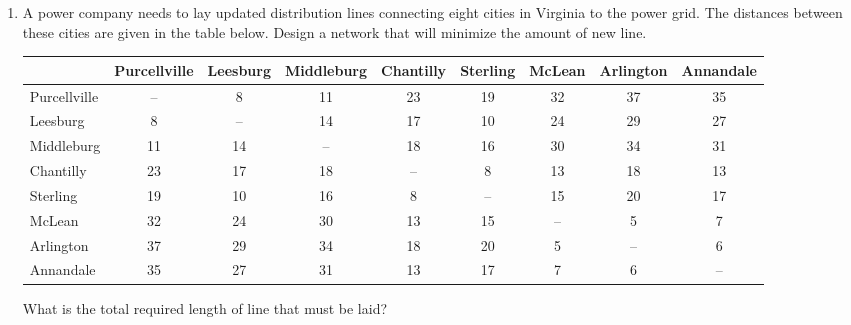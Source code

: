 \begin{enumerate}
\item A power company needs to lay updated distribution lines connecting eight cities in Virginia to the power grid.  The distances between these cities are given in the table below.  Design a network that will minimize the amount of new line.
\begin{center}
\begin{tabular}{l | c c c c c c c c}
& Purcellville & Leesburg & Middleburg & Chantilly & Sterling & McLean & Arlington & Annandale\\
\hline
Purcellville & -- & 8 & 11 & 23 & 19 & 32 & 37 & 35\\
Leesburg & 8 & -- & 14 & 17 & 10 & 24 & 29 & 27\\
Middleburg & 11 & 14 & -- & 18 & 16 & 30 & 34 & 31\\
Chantilly & 23 & 17 & 18 & -- & 8 & 13 & 18 & 13\\
Sterling & 19 & 10 & 16 & 8 & -- & 15 & 20 & 17\\
McLean & 32 & 24 & 30 & 13 & 15 & -- & 5 & 7\\
Arlington & 37 & 29 & 34 & 18 & 20 & 5 & -- & 6\\
Annandale & 35 & 27 & 31 & 13 & 17 & 7 & 6 & --
\end{tabular}
\end{center}
What is the total required length of line that must be laid? 
\begin{center}
\end{center}
\end{enumerate}